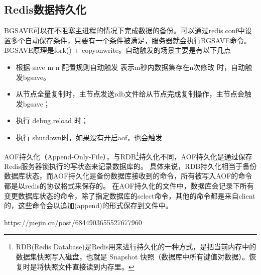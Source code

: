 \documentclass[../../../interview-questions.tex]{subfiles}
\begin{document}
\subsection{Redis数据持久化}

BGSAVE可以在不阻塞主进程的情况下完成数据的备份。可以通过redis.conf中设置多个自动保存条件，只要有一个条件被满足，服务器就会执行BGSAVE命令。BGSAVE原理是fork() + copyonwrite。自动触发的场景主要是有以下几点

\begin{itemize}
    \item {根据 save m n 配置规则自动触发} 表示m秒内数据集存在n次修改 时，自动触发bgsave。
    \item {从节点全量复制时，主节点发送rdb文件给从节点完成复制操作，主节点会触发bgsave；}
    \item {执行 debug reload 时；}
    \item {执行 shutdown时，如果没有开启aof，也会触发}
\end{itemize}

AOF持久化（Append-Only-File），与RDB\footnote{RDB(Redis Database)是Redis用来进行持久化的一种方式，是把当前内存中的数据集快照写入磁盘，也就是 Snapshot 快照（数据库中所有键值对数据）。恢复时是将快照文件直接读到内存里。}持久化不同，AOF持久化是通过保存Redis服务器锁执行的写状态来记录数据库的。
具体来说，RDB持久化相当于备份数据库状态，而AOF持久化是备份数据库接收到的命令，所有被写入AOF的命令都是以redis的协议格式来保存的。
在AOF持久化的文件中，数据库会记录下所有变更数据库状态的命令，除了指定数据库的select命令，其他的命令都是来自client的，这些命令会以追加(append)的形式保存到文件中。


https://juejin.cn/post/6844903655527677960
\end{document}
